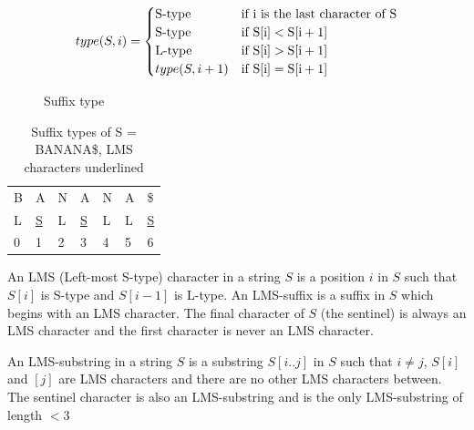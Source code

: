 \begin{figure}[t]
    \begin{center}
	$$
        type(S, i) =
        \begin{cases}
            \text{S-type} & \textrm{if\ i\ is\ the\ last\ character\ of\ S} \\
            \text{S-type} & \textrm{if\ } \ArrayAccess{\Var{S}}{\Var{i}} < \ArrayAccess{\Var{S}}{\Var{i + 1}} \\
            \text{L-type} & \textrm{if\ } \ArrayAccess{\Var{S}}{\Var{i}} > \ArrayAccess{\Var{S}}{\Var{i + 1}} \\
            type(S, i + 1) & \textrm{if\ } \ArrayAccess{\Var{S}}{\Var{i}} = \ArrayAccess{\Var{S}}{\Var{i + 1}} 
        \end{cases}
	$$

	\caption{Suffix type}
	\label{eq:suffixtypesrecurrence}
    \end{center}
\end{figure}

\begin{table}[t]
    \begin{center}
        \begin{tabular}[c]{l l l l l l l}
            B & A & N & A & N & A & \$ \\ 
            L & \underline{S} & L & \underline{S} & L & L & \underline{S} \\ 
            0 & 1 & 2 & 3 & 4 & 5 & 6 \\ 
        \end{tabular}
    \end{center}
    \caption{Suffix types of S = BANANA\$, LMS characters underlined}
    \label{tab:suffixtypesbanana}
\end{table}

\begin{definition}

    An LMS (Left-most S-type) character in a string $S$ is a position $i$ in $S$ such that
    $S[i]$ is S-type and $S[i-1]$ is L-type. An LMS-suffix is a suffix in $S$ which begins
    with an LMS character. The final character of $S$ (the sentinel) is always an LMS
    character and the first character is never an LMS character.

\end{definition}

\begin{definition}

    An LMS-substring in a string $S$ is a substring $S[i..j]$ in $S$ such that $i \neq j$,
    $S[i]$ and $[j]$ are LMS characters and there are no other LMS characters between. The
    sentinel character is also an LMS-substring and is the only LMS-substring of length
    $< 3$

\end{definition}

